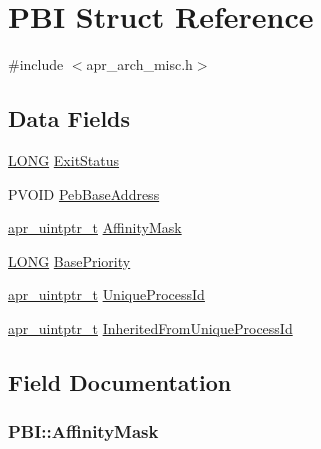 \hypertarget{structPBI}{}\section{P\+BI Struct Reference}
\label{structPBI}


{\ttfamily \#include $<$apr\+\_\+arch\+\_\+misc.\+h$>$}

\subsection*{Data Fields}
\begin{DoxyCompactItemize}
\item 
\hyperlink{mod__mime__magic_8c_acaa7b8a7167a8214f499c71c413ddcca}{L\+O\+NG} \hyperlink{structPBI_a9b57cf72fceb11a02dfca9daad2647cc}{Exit\+Status}
\item 
P\+V\+O\+ID \hyperlink{structPBI_a5848b9b53bcd57ebb2c876d7af3e9581}{Peb\+Base\+Address}
\item 
\hyperlink{group__apr__platform_gabf3268b941400de57926ee0f0ca56aa2}{apr\+\_\+uintptr\+\_\+t} \hyperlink{structPBI_acecc7a82cf226f2fa36c28fcb6ee5606}{Affinity\+Mask}
\item 
\hyperlink{mod__mime__magic_8c_acaa7b8a7167a8214f499c71c413ddcca}{L\+O\+NG} \hyperlink{structPBI_a5a3932ba93edb16616d47c2c0c254999}{Base\+Priority}
\item 
\hyperlink{group__apr__platform_gabf3268b941400de57926ee0f0ca56aa2}{apr\+\_\+uintptr\+\_\+t} \hyperlink{structPBI_ab705a75e976b129d6865e231ec46e366}{Unique\+Process\+Id}
\item 
\hyperlink{group__apr__platform_gabf3268b941400de57926ee0f0ca56aa2}{apr\+\_\+uintptr\+\_\+t} \hyperlink{structPBI_ad0be39a0e592d4764d0b019466a67770}{Inherited\+From\+Unique\+Process\+Id}
\end{DoxyCompactItemize}


\subsection{Field Documentation}
\subsubsection[{\texorpdfstring{Affinity\+Mask}{AffinityMask}}]{ P\+B\+I\+::\+Affinity\+Mask}\hypertarget{structPBI_acecc7a82cf226f2fa36c28fcb6ee5606}{}\label{structPBI_acecc7a82cf226f2fa36c28fcb6ee5606}
